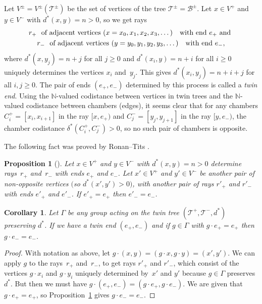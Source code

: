 \documentclass[pdftex]{sigma}
\numberwithin{equation}{section}
\newtheorem{Corollary}[Theorem]{Corollary}
\newtheorem{Proposition}[Theorem]{Proposition}
 { \theoremstyle{definition}
\newtheorem{Definition}[Theorem]{Definition}
\newtheorem{Remark}[Theorem]{Remark} }
\def\N{\mathbb{N}}
\def\cB{\mathcal B}
\def\cT{\mathcal T}
\begin{document}
Let $V^\pm = V^\pm(\cT^\pm)$ be the set of vertices of the tree $\cT^\pm = \cB^\pm$.
Let $x\in V^+$ and $y\in V^-$ with $d^*(x,y) = n > 0$, so we get rays
\begin{gather*} r_+\ \hbox{ of adjacent vertices }(x=x_0,x_1,x_2,x_3,\dots)\ \ \hbox{ with end } e_+ \hbox{ and }\\
r_-\ \hbox{ of adjacent vertices }(y=y_0,y_1,y_2,y_3,\dots)\ \ \hbox{ with end } e_-,
\end{gather*}
where $d^*(x,y_j) = n+j$ for all $j\geq0$ and $d^*(x_i,y) = n+i$ for all $i\geq0$ uniquely determines the vertices $x_i$ and~$y_j$. This gives $d^*(x_i,y_j) = n+i+j$ for all $i,j\geq0$. The pair of ends $(e_+,e_-)$ determined by this process is called a {\it twin end}. Using the $\N$-valued codistance between vertices in twin trees and the $\N$-valued codistance between chambers (edges), it seems clear that for any chambers $C_i^+ = [x_i,x_{i+1}]$ in the ray $[x,e_+)$ and $C_j^- = [y_j,y_{j+1}]$ in the ray $[y,e_-)$, the chamber codistance $\delta^*(C_i^+,C_j^-) > 0$, so no such pair of chambers is opposite.

The following fact was proved by Ronan--Tits \cite[Proposition~3.4]{RonanTits94}.

\begin{Proposition}[\cite{RonanTits94}] \label{prop:Ronan-Tits} Let $x\in V^+$ and $y\in V^-$ with $d^*(x,y) = n > 0$ determine rays~$r_+$ and~$r_-$ with ends $e_+$ and $e_-$. Let $x'\in V^+$ and $y'\in V^-$ be another pair of non-opposite vertices $($so $d^*(x',y')>0)$, with another pair of rays $r'_+$ and $r'_-$ with ends $e'_+$ and $e'_-$. If $e'_+ = e_+$ then $e'_- = e_-$.
\end{Proposition}

\begin{Corollary} \label{corollary:twin-ends} Let $\Gamma$ be any group acting on the twin tree $(\cT^+,\cT^-,d^*)$ preserving
$d^*$. If we have a twin end $(e_+,e_-)$ and if $g\in\Gamma$ with $g\cdot e_+ = e_+$ then $g\cdot e_- = e_-$.
\end{Corollary}
\begin{proof} With notation as above, let $g\cdot (x,y) = (g\cdot x,g\cdot y) = (x',y')$. We can apply $g$ to the rays~$r_+$ and~$r_-$, to get rays $r'_+$ and $r'_-$, which consist of the vertices $g\cdot x_i$ and $g\cdot y_i$ uniquely determined by~$x'$ and $y'$ because $g\in\Gamma$ preserves $d^*$. But then we must have $g\cdot (e_+,e_-) = (g\cdot e_+,g\cdot e_-)$. We are given that $g\cdot e_+ = e_+$, so Proposition~\ref{prop:Ronan-Tits} gives $g\cdot e_- = e_-$.
\end{proof}
\end{document}
